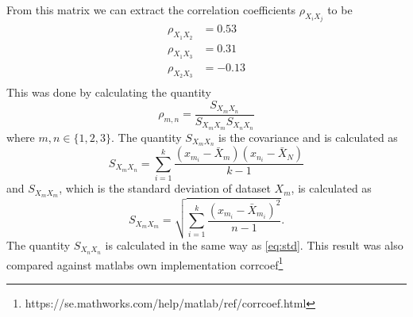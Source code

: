 \documentclass{article}
\begin{document}
    From this matrix we can extract the correlation coefficients $\rho_{X_iX_j}$ to be  
    \begin{equation}
        \begin{aligned}
            \rho_{X_1X_2} & = 0.53\\
            \rho_{X_1X_3} & = 0.31\\
            \rho_{X_2X_3} & = -0.13\\
        \end{aligned}
    \end{equation}
    This was done by calculating the quantity 
    \begin{equation}
        \rho_{m,n} = \frac{S_{X_mX_n}}{S_{X_{m}X_{m}}S_{X_{n}X_{n}}}
    \end{equation}
    where $m,n \in \{1, 2, 3\}$. The quantity $S_{X_{m}X_{n}}$ is the covariance and is calculated as 
    \begin{equation}
        S_{X_{m}X_{n}} = \sum_{i=1}^{k} \frac{(x_{m_i} - \bar{X}_m)(x_{n_i} - \bar{X}_N)}{k-1}
    \end{equation}
    and $S_{X_mX_m}$, which is the standard deviation of dataset $X_m$, is calculated as 
    \begin{equation}
        S_{X_{m}X_{m}} = \sqrt{\sum_{i=1}^{k} \frac{(x_{m_i} - \bar{X}_{m_i})^2}{n-1}}.
        \label{eq:std}
    \end{equation}
    The quantity $S_{X_nX_n}$ is calculated in the same way as \eqref{eq:std}. This result was also compared against matlabs own           implementation corrcoef\footnote{https://se.mathworks.com/help/matlab/ref/corrcoef.html}
 
\end{document}
